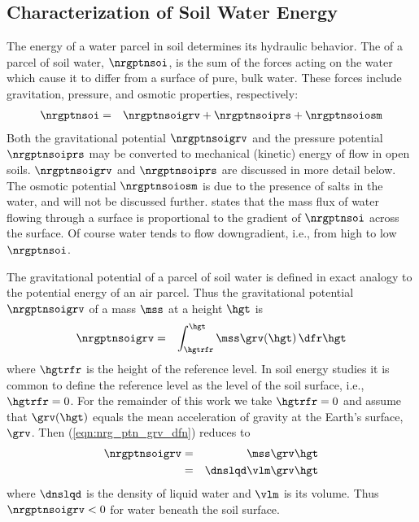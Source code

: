 \documentclass[12pt,twoside]{book}
\begin{document}
\subsection[Characterization of Soil Water Energy]{Characterization of Soil Water Energy}\label{sxn:soil_wtr_nrg}
The energy of a water parcel in soil determines its hydraulic behavior.
The  of a parcel of soil water,
$\nrgptnsoi$, is the sum of the forces acting on the water which cause
it to differ from a surface of pure, bulk water.
These forces include gravitation, pressure, and osmotic properties,
respectively:
\begin{eqnarray}
\nrgptnsoi & = & \nrgptnsoigrv + \nrgptnsoiprs + \nrgptnsoiosm
\label{eqn:nrg_ptn_ttl_dfn}
\end{eqnarray}
Both the gravitational potential $\nrgptnsoigrv$ and the pressure
potential $\nrgptnsoiprs$ may be converted to mechanical (kinetic) energy
of flow in open soils.
$\nrgptnsoigrv$ and $\nrgptnsoiprs$ are discussed in more detail below.
The osmotic potential $\nrgptnsoiosm$ is due to the presence of salts in 
the water, and will not be discussed further.
 states that the mass flux of water flowing
through a surface is proportional to the gradient of $\nrgptnsoi$
across the surface. 
Of course water tends to flow downgradient, i.e., from high to low
$\nrgptnsoi$. 

The gravitational potential of a parcel of soil water is defined in
exact analogy to the potential energy of an air parcel.
Thus the gravitational potential $\nrgptnsoigrv$ of a mass $\mss$
at a height $\hgt$ is
\begin{eqnarray}
\nrgptnsoigrv & = & \int_{\hgtrfr}^{\hgt} \mss \grv(\hgt) \,\dfr\hgt
\label{eqn:nrg_ptn_grv_dfn}
\end{eqnarray}
where $\hgtrfr$ is the height of the reference level.
In soil energy studies it is common to define the reference level
as the level of the soil surface, i.e., $\hgtrfr = 0$.
For the remainder of this work we take $\hgtrfr = 0$ and assume that 
$\grv(\hgt)$ equals the mean acceleration of gravity at the Earth's
surface, $\grv$.
Then (\ref{eqn:nrg_ptn_grv_dfn}) reduces to
\begin{eqnarray}
\nrgptnsoigrv & = & \mss \grv \hgt \\
& = & \dnslqd \vlm \grv \hgt
\label{eqn:nrg_grv_Hil82}
\end{eqnarray}
where $\dnslqd$ is the density of liquid water and $\vlm$ is its
volume. 
Thus $\nrgptnsoigrv < 0$ for water beneath the soil surface.
\end{document}
